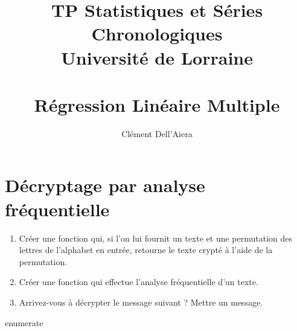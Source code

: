 \documentclass[a4paper]{article}
\title{TP Statistiques et Séries Chronologiques  \\ Université de Lorraine \\ ~ \\
\textbf{Régression Linéaire Multiple}}
\date{} %
\author{ Clément Dell'Aiera }
\begin{document}
  
\maketitle







\section{Décryptage par analyse fréquentielle}

\begin{enumerate}
\item Créer une fonction qui, si l'on lui fournit un texte et une permutation des lettres de l'alphabet en entrée, retourne le texte crypté à l'aide de la permutation.
\item Créer une fonction qui effectue l'analyse fréquentielle d'un texte.
\item Arrivez-vous à décrypter le message suivant ? Mettre un message. 
\end{enumerate}{enumerate}
\end{document}
